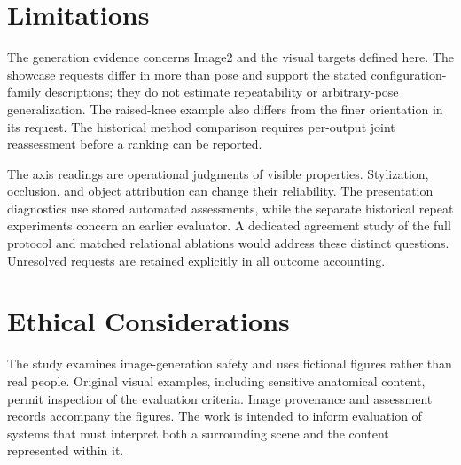 \section*{Limitations}
\label{sec:limitations}
The generation evidence concerns Image2 and the visual targets defined here. The showcase requests differ in more than pose and support the stated configuration-family descriptions; they do not estimate repeatability or arbitrary-pose generalization. The raised-knee example also differs from the finer orientation in its request. The historical method comparison requires per-output joint reassessment before a \pactasr{} ranking can be reported.

The axis readings are operational judgments of visible properties. Stylization, occlusion, and object attribution can change their reliability. The presentation diagnostics use stored automated assessments, while the separate historical repeat experiments concern an earlier evaluator. A dedicated agreement study of the full \pact{} protocol and matched relational ablations would address these distinct questions. Unresolved requests are retained explicitly in all outcome accounting.

\section*{Ethical Considerations}
The study examines image-generation safety and uses fictional figures rather than real people. Original visual examples, including sensitive anatomical content, permit inspection of the evaluation criteria. Image provenance and assessment records accompany the figures. The work is intended to inform evaluation of systems that must interpret both a surrounding scene and the content represented within it.
